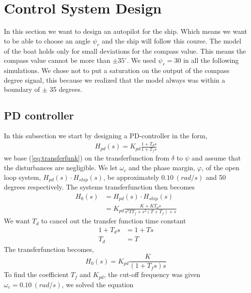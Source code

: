 \section{Control System Design} \label{sec:part3}
In this section we want to design an autopilot for the ship. Which means we want to be able to choose an angle $\psi_r$ and the ship will follow this course. The model of the boat holds only for small deviations for the compass value. This means the compass value cannot be more than $\pm 35^{\circ}$. We used $\psi_r = 30$ in all the following simulations. We chose not to put a saturation on the output of the compass degree signal, this because we realized that the model always was within a boundary of $\pm$ 35 degrees.  

\subsection{PD controller}
In this subsection we start by designing a PD-controller in the form,
\begin{equation}
\begin{split}
   H_{pd}(s) = K_{pd} \frac{1+T_d s}{1+T_f s}
\end{split}
\label{eq:transferfunk}
\end{equation}
we base (\ref{eq:transferfunk}) on the transferfunction from $\delta$ to $\psi$ and assume that the disturbances are negligible. We let $\omega_c$ and the phase margin, $\varphi$, of the open loop system, $H_{pd}(s) \cdot H_{ship}(s)$, be approximately $0.10 \  (rad/s)$ and 50 degrees respectively. The systems transferfunction then becomes 
\begin{equation}
\begin{split}
    H_0(s) &= H_{pd}(s) \cdot H_{ship}(s) \\
    &= K_{pd} \frac{K + KT_d s}{s^3 T T_f +s^2(T + T_f) + s}
\end{split}
\end{equation}
\bigskip
We want $T_d$ to cancel out the transfer function time constant
\begin{align*}
    1 + T_d s &= 1 + Ts \\
    T_d &= T
\end{align*}
The transferfunction becomes, 
\begin{equation}
   H_{0}(s) = K_{pd} \frac{K}{(1+T_f s)s}
\end{equation}
To find the coefficient $T_f$ and $K_{pd}$, the cut-off frequency was given $\omega_c = 0.10 \ (rad/s)$, we solved the equation 
